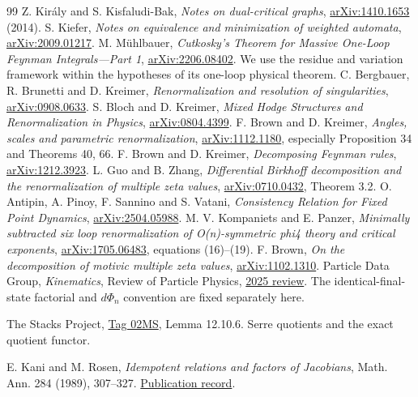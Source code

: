 \documentclass[11pt,a4paper,oneside]{article}
\theoremstyle{plain}
\theoremstyle{definition}
\theoremstyle{remark}
\numberwithin{equation}{section}
\begin{document}
\begin{thebibliography}{99}
 Z. Király and S. Kisfaludi-Bak, \emph{Notes on dual-critical graphs}, \href{https://arxiv.org/abs/1410.1653}{arXiv:1410.1653} (2014).
 S. Kiefer, \emph{Notes on equivalence and minimization of weighted automata}, \href{https://arxiv.org/abs/2009.01217}{arXiv:2009.01217}.
 M. Mühlbauer, \emph{Cutkosky's Theorem for Massive One-Loop Feynman Integrals---Part 1}, \href{https://arxiv.org/abs/2206.08402}{arXiv:2206.08402}. We use the residue and variation framework within the hypotheses of its one-loop physical theorem.
 C. Bergbauer, R. Brunetti and D. Kreimer, \emph{Renormalization and resolution of singularities}, \href{https://arxiv.org/abs/0908.0633}{arXiv:0908.0633}.
 S. Bloch and D. Kreimer, \emph{Mixed Hodge Structures and Renormalization in Physics}, \href{https://arxiv.org/abs/0804.4399}{arXiv:0804.4399}.
 F. Brown and D. Kreimer, \emph{Angles, scales and parametric renormalization}, \href{https://arxiv.org/abs/1112.1180}{arXiv:1112.1180}, especially Proposition 34 and Theorems 40, 66.
 F. Brown and D. Kreimer, \emph{Decomposing Feynman rules}, \href{https://arxiv.org/abs/1212.3923}{arXiv:1212.3923}.
 L. Guo and B. Zhang, \emph{Differential Birkhoff decomposition and the renormalization of multiple zeta values}, \href{https://arxiv.org/abs/0710.0432}{arXiv:0710.0432}, Theorem 3.2.
 O. Antipin, A. Pinoy, F. Sannino and S. Vatani, \emph{Consistency Relation for Fixed Point Dynamics}, \href{https://arxiv.org/abs/2504.05988}{arXiv:2504.05988}.
 M. V. Kompaniets and E. Panzer, \emph{Minimally subtracted six loop renormalization of O(n)-symmetric phi4 theory and critical exponents}, \href{https://arxiv.org/abs/1705.06483}{arXiv:1705.06483}, equations (16)--(19).
 F. Brown, \emph{On the decomposition of motivic multiple zeta values}, \href{https://arxiv.org/abs/1102.1310}{arXiv:1102.1310}.
 Particle Data Group, \emph{Kinematics}, Review of Particle Physics, \href{https://pdg.lbl.gov/2025/reviews/rpp2025-rev-kinematics.pdf}{2025 review}. The identical-final-state factorial and $d\Phi_n$ convention are fixed separately here.

The Stacks Project,
\href{https://stacks.math.columbia.edu/tag/02MS}{Tag 02MS},
Lemma 12.10.6. Serre quotients and the exact quotient functor.

E. Kani and M. Rosen,
\emph{Idempotent relations and factors of Jacobians},
Math. Ann. 284 (1989), 307--327.
\href{https://eudml.org/doc/164555}{Publication record}.



\end{thebibliography}
\end{document}
